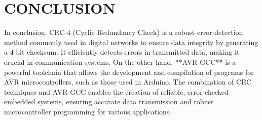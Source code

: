 \documentclass[conference]{IEEEtran}
\begin{document}
\section{CONCLUSION}
In conclusion, CRC-4 (Cyclic Redundancy Check) is a robust error-detection method commonly used in digital networks to ensure data integrity by generating a 4-bit checksum. It efficiently detects errors in transmitted data, making it crucial in communication systems. On the other hand, **AVR-GCC** is a powerful toolchain that allows the development and compilation of programs for AVR microcontrollers, such as those used in Arduino. The combination of CRC techniques and AVR-GCC enables the creation of reliable, error-checked embedded systems, ensuring accurate data transmission and robust microcontroller programming for various applications.
\end{document}
